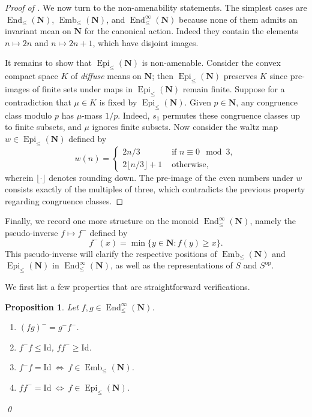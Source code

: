 \documentclass[12pt, pdflatex]{amsart}
\newtheorem{proposition}[theorem]{Proposition}
\theoremstyle{definition}
\numberwithin{equation}{section}
\numberwithin{theorem}{section}
\newcommand{\NN}{\mathbf{N}}
\DeclareMathOperator{\End}{End}
\DeclareMathOperator{\Emb}{Emb}
\DeclareMathOperator{\Epi}{Epi}
\begin{document}
\begin{proof}[Proof of ]
\medskip
We now turn to the non-amenability statements. The simplest cases are $\End_\leq(\NN)$, $\Emb_\leq(\NN)$, and $\End_\leq^\infty(\NN)$ because none of them admits an invariant mean on $\NN$ for the canonical action. Indeed they contain the elements $n\mapsto 2n$ and $n\mapsto 2n+1$, which have disjoint images.

It remains to show that $\Epi_\leq(\NN)$ is non-amenable. Consider the convex compact space $K$ of \emph{diffuse} means on $\NN$; then $\Epi_\leq(\NN)$ preserves $K$ since pre-images of finite sets under maps in $\Epi_\leq(\NN)$ remain finite. Suppose for a contradiction that $\mu\in K$ is fixed by $\Epi_\leq(\NN)$. Given $p\in \NN$, any congruence class modulo $p$ has $\mu$-mass $1/p$. Indeed, $s_1$ permutes these congruence classes up to finite subsets, and $\mu$ ignores finite subsets. Now consider the waltz map $w\in \Epi_\leq(\NN)$ defined by
\begin{equation*}
 w(n) = 
    \begin{cases}
        2 n/3 &\text{ if } n\equiv 0 \mod 3, \\
        2 \lfloor n/3 \rfloor +1  &\text{ otherwise},
    \end{cases}
\end{equation*}
wherein $\lfloor \cdot \rfloor$ denotes rounding down. The pre-image of the even numbers under $w$ consists exactly of the multiples of three, which contradicts the previous property regarding congruence classes.
\end{proof}

Finally, we record one more structure on the monoid $\End_\leq^\infty(\NN)$, namely the pseudo-inverse $f\mapsto f^-$ defined by
\begin{equation*}
f^-(x) = \min\{ y \in \NN : f(y) \geq x \}.
\end{equation*}
This pseudo-inverse will clarify the respective positions of $\Emb_\leq(\NN)$ and $\Epi_\leq(\NN)$ in $\End_\leq^\infty(\NN)$, as well as the representations of $S$ and $S^\mathrm{op}$.

We first list a few properties that are straightforward verifications.

\begin{proposition}\label{prop:inverse}
Let $f, g\in \End_\leq^\infty(\NN)$.
  \begin{enumerate}
\item $(f g)^- = g^- f^-$.
\item $f^- f \leq \mathrm{Id}$, $f f^- \geq \mathrm{Id}$.
\item $f^- f = \mathrm{Id} \ \Longleftrightarrow\ f\in \Emb_\leq(\NN)$.
\item $f f^- = \mathrm{Id} \ \Longleftrightarrow\ f\in \Epi_\leq(\NN)$.
  \end{enumerate}\qed
\end{proposition}
\end{document}
